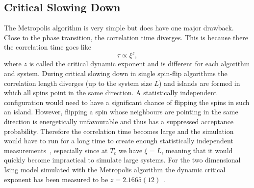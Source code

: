 \documentclass[11pt, a4paper]{report} %
\begin{document}
\subsection{Critical Slowing Down}\label{sec:critical_slowing_down}
The Metropolis algorithm is very simple but does have one major drawback.
Close to the phase transition, the correlation time diverges.
This is because there the correlation time goes like
\begin{equation}
	\tau \propto \xi^z,
\end{equation}
where \(z\) is called the critical dynamic exponent and is different for each algorithm and system.
During critical slowing down in single spin-flip algorithms the correlation length diverges (up to the system size \(L\)) and islands are formed in which all spins point in the same direction.
A statistically independent configuration would need to have a significant chance of flipping the spins in such an island.
However, flipping a spin whose neighbours are pointing in the same direction is energetically unfavourable and thus has a suppressed acceptance probability.
Therefore the correlation time becomes large and the simulation would have to run for a long time to create enough statistically independent measurements~\cite{binney:1992}, especially since at \(T_c\) we have \(\xi = L\), meaning that it would quickly become impractical to simulate large systems.
For the two dimensional Ising model simulated with the  Metropolis algorithm the dynamic critical exponent has been measured to be \(z=2.1665(12)\)~\cite{nightingale:1996}.
\end{document}
